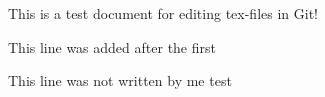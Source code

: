 \documentclass[10pt,conference]{IEEEtran}
\begin{document}
This is a test document for editing tex-files in Git!

This line was added after the first

This line was not written by me
test
\end{document}
